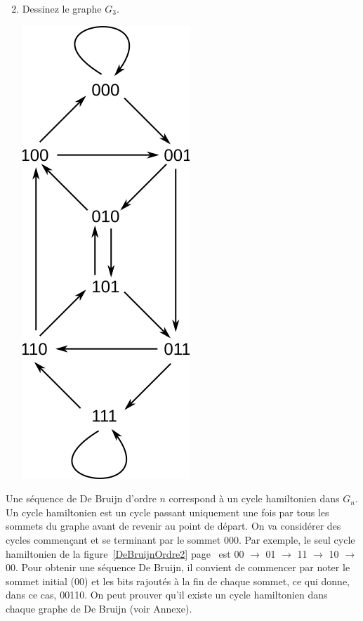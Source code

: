 \documentclass[11pt]{article}
\begin{document}
\begin{enumerate}
\setcounter{enumi}{1}
\item Dessinez le graphe $G_3$.


\begin{solution}
\centerline{\includegraphics{order-3}}
\end{solution}
\end{enumerate}


Une séquence de De Bruijn d'ordre $n$ correspond à un cycle hamiltonien dans
$G_n$. Un cycle hamiltonien est un cycle passant uniquement une fois par
tous les sommets du graphe avant de revenir au point de départ.
On va considérer des cycles commençant et se terminant par le sommet 000.
Par exemple, le seul cycle hamiltonien de
la figure~\ref{DeBruijnOrdre2} page~\pageref{DeBruijnOrdre2} est 00
$\rightarrow$ 01 $\rightarrow$ 11 $\rightarrow$ 10 $\rightarrow$ 00.
Pour obtenir une séquence De Bruijn, il convient de commencer par noter
le sommet initial (00) et les bits rajoutés à la fin de chaque sommet,
ce qui donne, dans ce cas, 00110. On peut prouver qu'il existe un cycle
hamiltonien dans chaque graphe de De Bruijn (voir Annexe).
\end{document}

